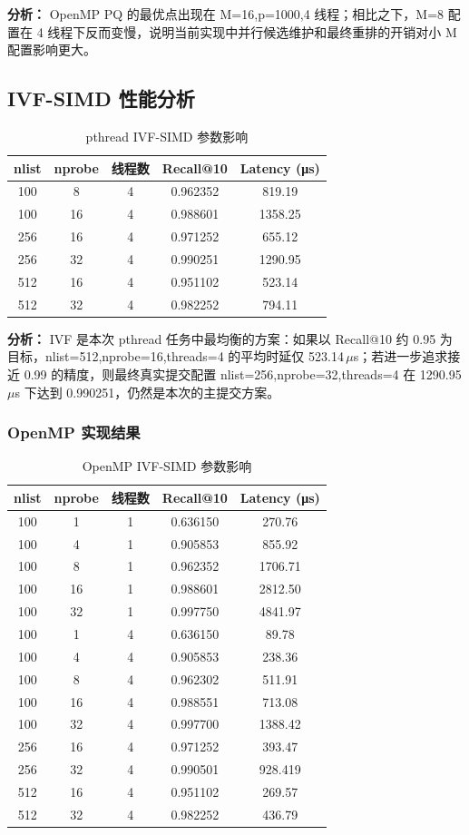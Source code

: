 \documentclass[a4paper]{article}
\begin{document}
\textbf{分析：} OpenMP PQ 的最优点出现在 M=16,p=1000,4 线程；相比之下，M=8 配置在 4 线程下反而变慢，说明当前实现中并行候选维护和最终重排的开销对小 M 配置影响更大。

\subsection{IVF-SIMD 性能分析}

\begin{table}[htbp]
\centering
\caption{pthread IVF-SIMD 参数影响}
\begin{tabular}{ccccc}
\toprule
nlist & nprobe & 线程数 & Recall@10 & Latency (μs) \\
\midrule
100 & 8 & 4 & 0.962352 & 819.19 \\
100 & 16 & 4 & 0.988601 & 1358.25 \\
256 & 16 & 4 & 0.971252 & 655.12 \\
256 & 32 & 4 & 0.990251 & 1290.95 \\
512 & 16 & 4 & 0.951102 & 523.14 \\
512 & 32 & 4 & 0.982252 & 794.11 \\
\bottomrule
\end{tabular}
\end{table}

\textbf{分析：} IVF 是本次 pthread 任务中最均衡的方案：如果以 Recall@10 约 0.95 为目标，nlist=512,nprobe=16,threads=4 的平均时延仅 523.14\,$\mu$s；若进一步追求接近 0.99 的精度，则最终真实提交配置 nlist=256,nprobe=32,threads=4 在 1290.95\,$\mu$s 下达到 0.990251，仍然是本次的主提交方案。

\subsubsection{OpenMP 实现结果}

\begin{table}[htbp]
\centering
\caption{OpenMP IVF-SIMD 参数影响}
\begin{tabular}{ccccc}
\toprule
nlist & nprobe & 线程数 & Recall@10 & Latency (μs) \\
\midrule
100 & 1 & 1 & 0.636150 & 270.76 \\
100 & 4 & 1 & 0.905853 & 855.92 \\
100 & 8 & 1 & 0.962352 & 1706.71 \\
100 & 16 & 1 & 0.988601 & 2812.50 \\
100 & 32 & 1 & 0.997750 & 4841.97 \\
100 & 1 & 4 & 0.636150 & 89.78 \\
100 & 4 & 4 & 0.905853 & 238.36 \\
100 & 8 & 4 & 0.962302 & 511.91 \\
100 & 16 & 4 & 0.988551 & 713.08 \\
100 & 32 & 4 & 0.997700 & 1388.42 \\
256 & 16 & 4 & 0.971252 & 393.47 \\
256 & 32 & 4 & 0.990501 & 928.419 \\
512 & 16 & 4 & 0.951102 & 269.57 \\
512 & 32 & 4 & 0.982252 & 436.79 \\
\bottomrule
\end{tabular}
\end{table}
\end{document}
